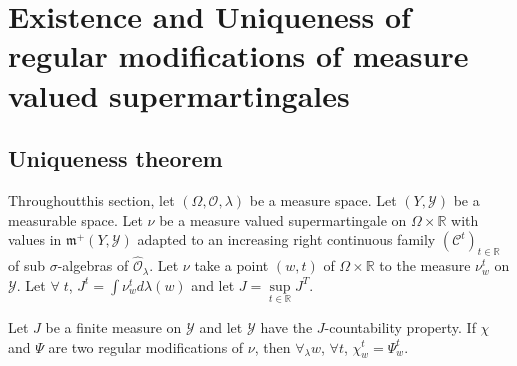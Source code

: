 
\chapter[Existence and Uniqueness of...]{Existence and Uniqueness of
  regular modifications of measure 
  valued supermartingales}\label{part2:chap5}

\section{Uniqueness theorem}\label{part2:chap5:sec1}

Throughout\pageoriginale this section, let $(\Omega, \mathscr{O},
\lambda)$ be a measure space. Let $(Y, \mathscr{Y})$ be a measurable
space. Let $\nu$ be a measure valued supermartingale on $\Omega \times
\mathbb{R}$  with values in $\mathfrak{m}^+ (Y, \mathscr{Y})$ adapted
to an increasing right continuous family $(\mathscr{C}^t)_{t
  \in\mathbb{R}}$  of sub $\sigma$-algebras of
$\hat{\mathscr{O}}_\lambda$. Let $\nu$ take a point $(w,t)$ of $\Omega
\times \mathbb{R}$ to the measure $\nu^t_w$ on $\mathscr{Y}$. Let
$\forall \; t$,  $J^t = \int \nu^t_wd \lambda(w)$ and let $J =
\sup\limits_{t \in \mathbb{R}} J^T$. 

\begin{thm}[Uniqueness]\label{part2:chap5:thm76}
Let $J$ be a finite measure on $\mathscr{Y}$ and let $\mathscr{Y}$
have the $J$-countability property. If $\chi$ and $\Psi$ are two
regular modifications of $\nu$, then $\forall_\lambda w$, $\forall t$,
$\chi^t_w = \Psi^t_w$. 
\end{thm}

